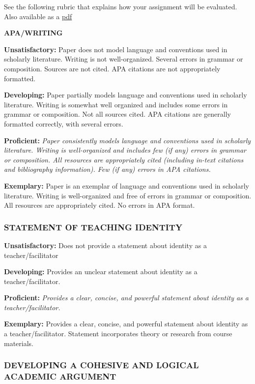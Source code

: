 \documentclass[
]{book}
\begin{document}
See the following rubric that explains how your assignment will be evaluated. Also available as a \href{assets/assessment/Identity-as-a-Teacher-RUBRIC.pdf}{pdf}

\textbf{APA/WRITING}

\textbf{Unsatisfactory:} Paper does not model language and conventions used in scholarly literature. Writing is not well-organized. Several errors in grammar or composition. Sources are not cited. APA citations are not appropriately formatted.

\textbf{Developing:} Paper partially models language and conventions used in scholarly literature. Writing is somewhat well organized and includes some errors in grammar or composition. Not all sources cited. APA citations are generally formatted correctly, with several errors.

\textbf{Proficient:} \emph{Paper consistently models language and conventions used in scholarly literature. Writing is well-organized and includes few (if any) errors in grammar or composition. All resources are appropriately cited (including in-text citations and bibliography information). Few (if any) errors in APA citations.}

\textbf{Exemplary:} Paper is an exemplar of language and conventions used in scholarly literature. Writing is well-organized and free of errors in grammar or composition. All resources are appropriately cited. No errors in APA format.

\hypertarget{statement-of-teaching-identity}{%
\subsubsection*{STATEMENT OF TEACHING IDENTITY}\label{statement-of-teaching-identity}}

\textbf{Unsatisfactory:} Does not provide a statement about identity as a teacher/facilitator

\textbf{Developing:} Provides an unclear statement about identity as a teacher/facilitator.

\textbf{Proficient:} \emph{Provides a clear, concise, and powerful statement about identity as a teacher/facilitator.}

\textbf{Exemplary:} Provides a clear, concise, and powerful statement about identity as a teacher/facilitator. Statement incorporates theory or research from course materials.

\hypertarget{developing-a-cohesive-and-logical-academic-argument}{%
\subsubsection*{DEVELOPING A COHESIVE AND LOGICAL ACADEMIC ARGUMENT}\label{developing-a-cohesive-and-logical-academic-argument}}
\end{document}
